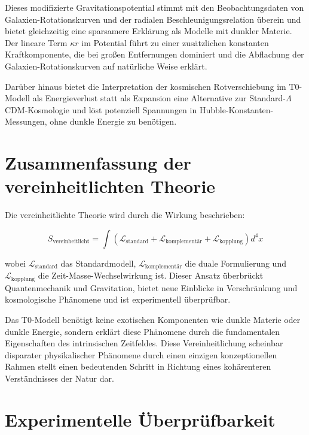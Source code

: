 \documentclass[a4paper,12pt]{article}
\begin{document}
	Dieses modifizierte Gravitationspotential stimmt mit den Beobachtungsdaten von Galaxien-Rotationskurven \cite{rubin1980} und der radialen Beschleunigungsrelation \cite{McGaugh2016} überein und bietet gleichzeitig eine sparsamere Erklärung als Modelle mit dunkler Materie. Der lineare Term \(\kappa r\) im Potential führt zu einer zusätzlichen konstanten Kraftkomponente, die bei großen Entfernungen dominiert und die Abflachung der Galaxien-Rotationskurven auf natürliche Weise erklärt.
	
	Darüber hinaus bietet die Interpretation der kosmischen Rotverschiebung im T0-Modell als Energieverlust statt als Expansion eine Alternative zur Standard-\(\Lambda\)CDM-Kosmologie \cite{Planck2018} und löst potenziell Spannungen in Hubble-Konstanten-Messungen, ohne dunkle Energie zu benötigen.
	
	\section{Zusammenfassung der vereinheitlichten Theorie}
	
	Die vereinheitlichte Theorie wird durch die Wirkung beschrieben:
	
	\begin{equation}
		S_\text{vereinheitlicht} = \int \left( \mathcal{L}_\text{standard} + \mathcal{L}_\text{komplementär} + \mathcal{L}_\text{kopplung} \right) d^4x
	\end{equation}
	
	wobei \(\mathcal{L}_\text{standard}\) das Standardmodell, \(\mathcal{L}_\text{komplementär}\) die duale Formulierung und \(\mathcal{L}_\text{kopplung}\) die Zeit-Masse-Wechselwirkung ist. Dieser Ansatz überbrückt Quantenmechanik und Gravitation, bietet neue Einblicke in Verschränkung und kosmologische Phänomene und ist experimentell überprüfbar.
	
	Das T0-Modell benötigt keine exotischen Komponenten wie dunkle Materie oder dunkle Energie, sondern erklärt diese Phänomene durch die fundamentalen Eigenschaften des intrinsischen Zeitfeldes. Diese Vereinheitlichung scheinbar disparater physikalischer Phänomene durch einen einzigen konzeptionellen Rahmen stellt einen bedeutenden Schritt in Richtung eines kohärenteren Verständnisses der Natur dar.
	
	\section{Experimentelle Überprüfbarkeit}
	
\end{document}
